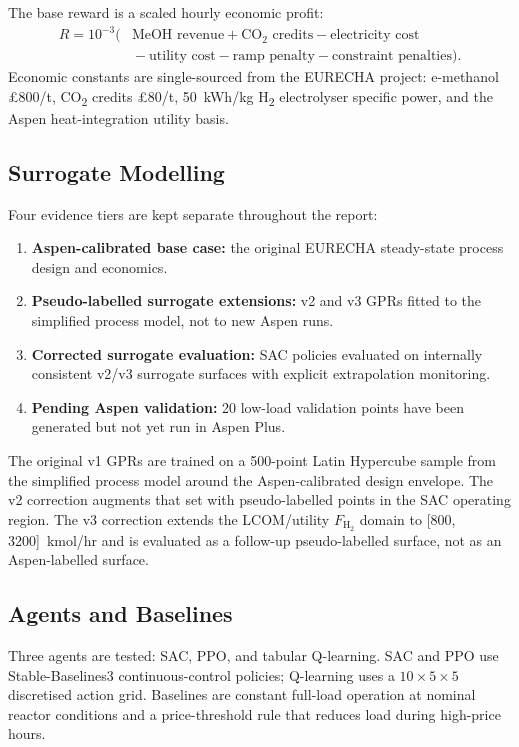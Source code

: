 \documentclass[11pt,a4paper]{article}
\begin{document}
The base reward is a scaled hourly economic profit:
\begin{align}
  R = 10^{-3}\big(&
      \text{MeOH revenue}
      + \text{CO}_2\text{ credits}
      - \text{electricity cost} \nonumber\\
      &{} - \text{utility cost}
      - \text{ramp penalty}
      - \text{constraint penalties}\big).
\end{align}
Economic constants are single-sourced from the EURECHA project: e-methanol
\pounds800/t, CO\textsubscript{2} credits \pounds80/t, 50~kWh/kg
H\textsubscript{2} electrolyser specific power, and the Aspen heat-integration
utility basis.

\subsection{Surrogate Modelling}

Four evidence tiers are kept separate throughout the report:
\begin{enumerate}[nosep]
  \item \textbf{Aspen-calibrated base case:} the original EURECHA steady-state
        process design and economics.
  \item \textbf{Pseudo-labelled surrogate extensions:} v2 and v3 GPRs fitted
        to the simplified process model, not to new Aspen runs.
  \item \textbf{Corrected surrogate evaluation:} SAC policies evaluated on
        internally consistent v2/v3 surrogate surfaces with explicit
        extrapolation monitoring.
  \item \textbf{Pending Aspen validation:} 20 low-load validation points have
        been generated but not yet run in Aspen Plus.
\end{enumerate}

The original v1 GPRs are trained on a 500-point Latin Hypercube sample from
the simplified process model around the Aspen-calibrated design envelope.
The v2 correction augments that set with pseudo-labelled points in the SAC
operating region. The v3 correction extends the LCOM/utility
$F_{\mathrm{H}_2}$ domain to [800, 3200]~kmol/hr and is evaluated as a
follow-up pseudo-labelled surface, not as an Aspen-labelled surface.

\subsection{Agents and Baselines}

Three agents are tested: SAC, PPO, and tabular Q-learning. SAC and PPO use
Stable-Baselines3 continuous-control policies; Q-learning uses a
$10\times5\times5$ discretised action grid. Baselines are constant full-load
operation at nominal reactor conditions and a price-threshold rule that
reduces load during high-price hours.
\end{document}
